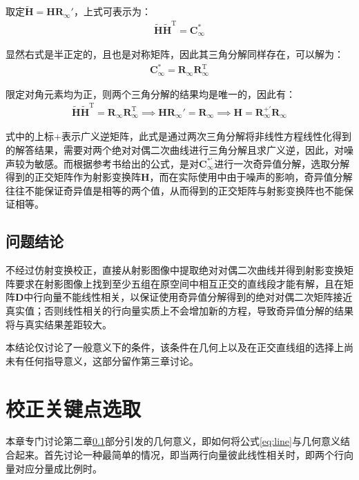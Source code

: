 \documentclass[11pt]{article}
\begin{document}
取定$\mathbf{\tilde{H}=HR_\infty'}$，上式可表示为：
\begin{align*}
  \tilde{\mathbf{{H}}}\tilde{\mathbf{H}}^\mathrm{T}=\mathbf{C_\infty^*}
\end{align*}\par
显然右式是半正定的，且也是对称矩阵，因此其三角分解同样存在，可以解为：
\begin{align*}
  \mathbf{C_\infty^*}=\mathbf{R_\infty R_\infty^\mathrm{T}}
\end{align*}\par
限定对角元素均为正，则两个三角分解的结果均是唯一的，因此有：
\begin{align}
  \tilde{\mathbf{{H}}}\tilde{\mathbf{H}}^\mathrm{T}=\mathbf{R_\infty R_\infty^\mathrm{T}}\implies\mathbf{HR_\infty'=R_\infty}\implies\mathbf{H=R_\infty^{+'}R_\infty}
  \label{eq:Cholesky}
\end{align}\par
式中的上标$+$表示广义逆矩阵，此式是通过两次三角分解将非线性方程线性化得到的解答结果，需要对两个绝对对偶二次曲线进行三角分解且求广义逆，因此，对噪声较为敏感。而根据参考书\cite{hartley2003multiple}给出的公式，是对$\mathbf{C_\infty^{*'}}$进行一次奇异值分解，选取分解得到的正交矩阵作为射影变换阵$\mathbf{H}$，而在实际使用中由于噪声的影响，奇异值分解往往不能保证奇异值是相等的两个值，从而得到的正交矩阵与射影变换阵也不能保证相等。
\subsection{问题结论}
\label{sec:问题结论}
不经过仿射变换校正，直接从射影图像中提取绝对对偶二次曲线并得到射影变换矩阵要求在射影图像上找到至少五组在原空间中相互正交的直线段才能有解，且在矩阵$\mathbf{D}$中行向量不能线性相关，以保证使用奇异值分解得到的绝对对偶二次矩阵接近真实值；否则线性相关的行向量实质上不会增加新的方程，导致奇异值分解的结果将与真实结果差距较大。\par
本结论仅讨论了一般意义下的条件，该条件在几何上以及在正交直线组的选择上尚未有任何指导意义，这部分留作第三章讨论。
\section{校正关键点选取}
本章专门讨论第二章\ref{sec:问题结论}部分引发的几何意义，即如何将公式\ref{eq:line}与几何意义结合起来。首先讨论一种最简单的情况，即当两行向量彼此线性相关时，即两个行向量对应分量成比例时。
\end{document}
